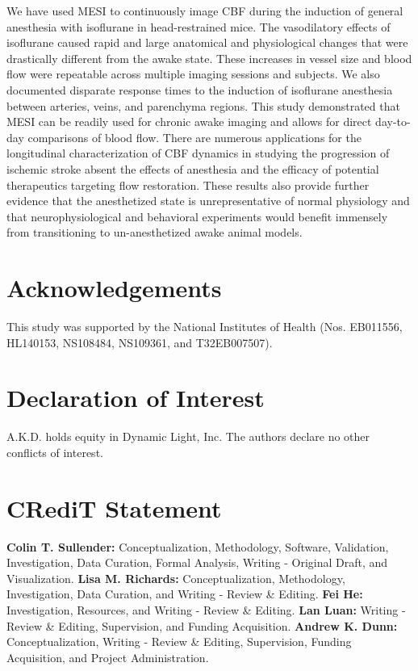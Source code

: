 \documentclass[review]{elsarticle}
\begin{document}
We have used MESI to continuously image CBF during the induction of general anesthesia with isoflurane in head-restrained mice. The vasodilatory effects of isoflurane caused rapid and large anatomical and physiological changes that were drastically different from the awake state. These increases in vessel size and blood flow were repeatable across multiple imaging sessions and subjects. We also documented disparate response times to the induction of isoflurane anesthesia between arteries, veins, and parenchyma regions. This study demonstrated that MESI can be readily used for chronic awake imaging and allows for direct day-to-day comparisons of blood flow. There are numerous applications for the longitudinal characterization of CBF dynamics in studying the progression of ischemic stroke absent the effects of anesthesia and the efficacy of potential therapeutics targeting flow restoration. These results also provide further evidence that the anesthetized state is unrepresentative of normal physiology and that neurophysiological and behavioral experiments would benefit immensely from transitioning to un-anesthetized awake animal models.



\section*{Acknowledgements}
This study was supported by the National Institutes of Health (Nos. EB011556, HL140153, NS108484, NS109361, and T32EB007507).

\section*{Declaration of Interest}
A.K.D. holds equity in Dynamic Light, Inc. The authors declare no other conflicts of interest.

\section*{CRediT Statement}
\textbf{Colin T. Sullender:} Conceptualization, Methodology, Software, Validation, Investigation, Data Curation, Formal Analysis, Writing - Original Draft, and Visualization. \textbf{Lisa M. Richards:} Conceptualization, Methodology, Investigation, Data Curation, and Writing - Review \& Editing. \textbf{Fei He:} Investigation, Resources, and Writing - Review \& Editing. \textbf{Lan Luan:} Writing - Review \& Editing, Supervision, and Funding Acquisition. \textbf{Andrew K. Dunn:} Conceptualization, Writing - Review \& Editing, Supervision, Funding Acquisition, and Project Administration.
\end{document}
